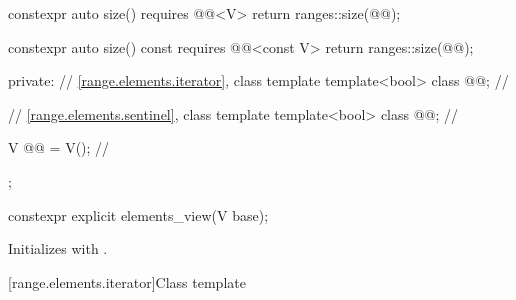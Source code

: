\begin{codeblock}
{{    constexpr auto size() requires @@<V>
    { return ranges::size(@@); }

    constexpr auto size() const requires @@<const V>
    { return ranges::size(@@); }

  private:
    // \ref{range.elements.iterator}, class template 
    template<bool> class @@;                      // \expos

    // \ref{range.elements.sentinel}, class template 
    template<bool> class @@;                      // \expos

    V @@ = V();                                      // \expos
  };
}
\end{codeblock}

%
\begin{itemdecl}
constexpr explicit elements_view(V base);
\end{itemdecl}

\begin{itemdescr}
\pnum
\effects
Initializes  with .
\end{itemdescr}

[range.elements.iterator]{Class template }

